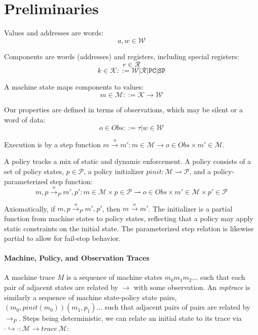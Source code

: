 \documentclass{article}
\begin{document}
  \section{Preliminaries}

    Values and addresses are words:
    \[a,w \in \mathcal{W}\]

    Components are words (addresses) and registers, including special registers:
    \[r \in \mathcal{R}\]
    \[k \in \mathcal{K} ::= \mathcal{W} | \mathcal{R} | \mathtt{PC} | \mathtt{SP}\]

    A machine state maps components to values:
    \[m \in \mathcal{M} ::= \mathcal{K} \rightarrow \mathcal{W}\]

    Our properties are defined in terms of observations, which may be silent or a word of data:
    \[o \in \mathit{Obs} ::= \tau | w \in \mathcal{W}\]
    
    Execution is by a step function \(m \xrightarrow{o} m' : m \in \mathcal{M} \rightarrow
    o \in \mathit{Obs} \times m' \in \mathcal{M}\).

    A policy tracks a mix of static and dynamic enforcement. A policy consists of
    a set of policy states, \(p \in \mathcal{P}\), a policy initializer
    \(pinit : \mathcal{M} \rightharpoonup \mathcal{P}\), and a policy-parameterized step function:
    \[m, p \xrightarrow{o}_P m', p' : m \in \mathcal{M} \times p \in \mathcal{P} \rightharpoonup
    o \in \mathit{Obs} \times m' \in \mathcal{M} \times p' \in \mathcal{P}\]

    Axiomatically, if \(m,p \xrightarrow{o}_P m',p'\), then \(m \xrightarrow{o} m'\).
    The initializer is a partial function from machine states to policy
    states, reflecting that a policy may apply static constraints on the initial state. The parameterized
    step relation is likewise partial to allow for fail-stop behavior.

  \paragraph{Machine, Policy, and Observation Traces}

    A machine trace \(M\) is a sequence of machine states \(m_0 m_1 m_2 \dots\) such that each
    pair of adjacent states are related by \(\longrightarrow\) with some observation. An
    {\it mptrace} is similarly a sequence of machine state-policy state pairs,
    \((m_0,\mathit{pinit}(m_0))(m_1,p_1) \dots\) such that adjacent pairs of pairs are related
    by \(\longrightarrow_P\). Steps being deterministic, we can relate an initial state to its trace
    via \(\cdot \hookrightarrow \cdot : \mathcal{M} \rightarrow \mathit{trace}\ \mathcal{M}\):
\end{document}
